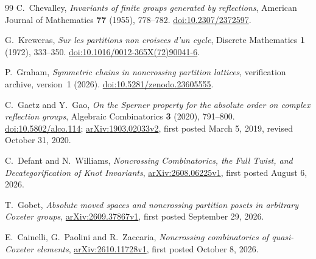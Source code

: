 \documentclass[11pt]{article}
\theoremstyle{definition}
\begin{document}
\begin{thebibliography}{99}
C.~Chevalley, \emph{Invariants of finite groups generated by reflections},
American Journal of Mathematics \textbf{77} (1955), 778--782.
\href{https://doi.org/10.2307/2372597}{doi:10.2307/2372597}.

G.~Kreweras, \emph{Sur les partitions non croisees d'un cycle},
Discrete Mathematics \textbf{1} (1972), 333--350.
\href{https://doi.org/10.1016/0012-365X(72)90041-6}{doi:10.1016/0012-365X(72)90041-6}.

P.~Graham, \emph{Symmetric chains in noncrossing partition lattices},
verification archive, version~1 (2026).
\href{https://doi.org/10.5281/zenodo.23605555}{doi:10.5281/zenodo.23605555}.

C.~Gaetz and Y.~Gao,
\emph{On the Sperner property for the absolute order on complex reflection groups},
Algebraic Combinatorics \textbf{3} (2020), 791--800.
\href{https://doi.org/10.5802/alco.114}{doi:10.5802/alco.114};
\href{https://arxiv.org/abs/1903.02033v2}{arXiv:1903.02033v2}, first posted March 5, 2019, revised October 31, 2020.

C.~Defant and N.~Williams,
\emph{Noncrossing Combinatorics, the Full Twist, and Decategorification of Knot Invariants},
\href{https://arxiv.org/abs/2608.06225v1}{arXiv:2608.06225v1}, first posted August 6, 2026.

T.~Gobet,
\emph{Absolute moved spaces and noncrossing partition posets in arbitrary Coxeter groups},
\href{https://arxiv.org/abs/2609.37867v1}{arXiv:2609.37867v1}, first posted September 29, 2026.

E.~Cainelli, G.~Paolini and R.~Zaccaria,
\emph{Noncrossing combinatorics of quasi-Coxeter elements},
\href{https://arxiv.org/abs/2610.11728v1}{arXiv:2610.11728v1}, first posted October 8, 2026.

\end{thebibliography}
\end{document}
